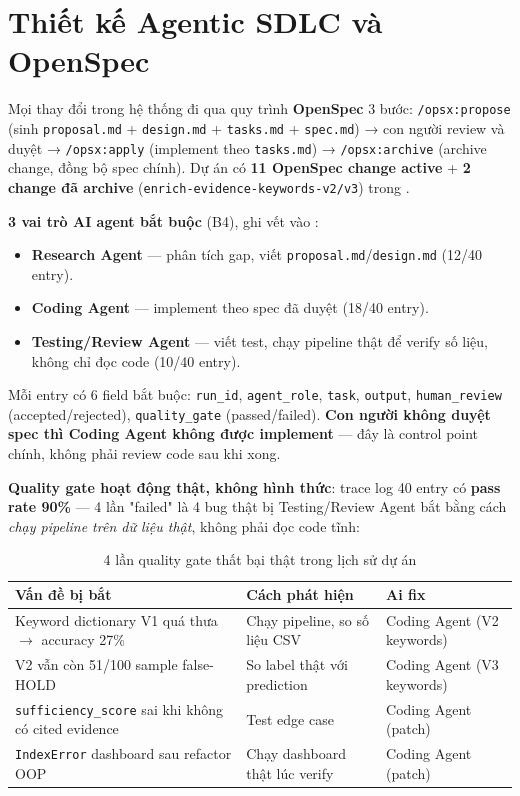 \section{Thiết kế Agentic SDLC và OpenSpec}

Mọi thay đổi trong hệ thống đi qua quy trình \textbf{OpenSpec} 3 bước: \texttt{/opsx:propose} (sinh \texttt{proposal.md} + \texttt{design.md} + \texttt{tasks.md} + \texttt{spec.md}) → con người review và duyệt → \texttt{/opsx:apply} (implement theo \texttt{tasks.md}) → \texttt{/opsx:archive} (archive change, đồng bộ spec chính). Dự án có \textbf{11 OpenSpec change active} + \textbf{2 change đã archive} (\texttt{enrich-evidence-keywords-v2/v3}) trong .

\textbf{3 vai trò AI agent bắt buộc} (B4), ghi vết vào :

\begin{itemize}
  \item \textbf{Research Agent} — phân tích gap, viết \texttt{proposal.md}/\texttt{design.md} (12/40 entry).
  \item \textbf{Coding Agent} — implement theo spec đã duyệt (18/40 entry).
  \item \textbf{Testing/Review Agent} — viết test, chạy pipeline thật để verify số liệu, không chỉ đọc code (10/40 entry).
\end{itemize}

Mỗi entry có 6 field bắt buộc: \texttt{run\_id}, \texttt{agent\_role}, \texttt{task}, \texttt{output}, \texttt{human\_review} (accepted/rejected), \texttt{quality\_gate} (passed/failed). \textbf{Con người không duyệt spec thì Coding Agent không được implement} — đây là control point chính, không phải review code sau khi xong.

\textbf{Quality gate hoạt động thật, không hình thức}: trace log 40 entry có \textbf{pass rate 90\%} — 4 lần "failed" là 4 bug thật bị Testing/Review Agent bắt bằng cách \textit{chạy pipeline trên dữ liệu thật}, không phải đọc code tĩnh:

\begin{table}[H]
\centering
\caption{4 lần quality gate thất bại thật trong lịch sử dự án}
\begin{tabularx}{\textwidth}{|X|X|X|}
\hline
\textbf{Vấn đề bị bắt} & \textbf{Cách phát hiện} & \textbf{Ai fix} \\ \hline
Keyword dictionary V1 quá thưa $\to$ accuracy 27\% & Chạy pipeline, so số liệu CSV & Coding Agent (V2 keywords) \\ \hline
V2 vẫn còn 51/100 sample false-HOLD & So label thật với prediction & Coding Agent (V3 keywords) \\ \hline
\texttt{sufficiency\_score} sai khi không có cited evidence & Test edge case & Coding Agent (patch) \\ \hline
\texttt{IndexError} dashboard sau refactor OOP & Chạy dashboard thật lúc verify & Coding Agent (patch) \\ \hline
\end{tabularx}
\end{table}

